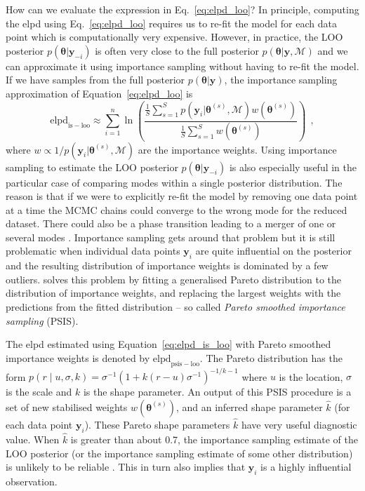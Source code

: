 \documentclass[12pt,dvipsnames]{report}
\renewcommand{\vec}[1]{\boldsymbol{\mathbf{#1}}}
\newcommand{\hquad}{~~}
\begin{document}
How can we evaluate the expression in Eq.~\ref{eq:elpd_loo}?
In principle, computing the elpd using Eq.~\ref{eq:elpd_loo} requires us to 
re-fit the model for each data point which is computationally very expensive. 
However, in practice, the LOO posterior $p(\vec \theta|\vec y_{-i})$
is often very close to the full posterior $p(\vec \theta|\vec y,\mathcal{M})$
and we can approximate it using importance sampling without having to re-fit the model.
If we have samples from the full posterior $p(\vec \theta|\vec y)$, the importance 
sampling approximation of Equation~\ref{eq:elpd_loo} is 
\begin{equation}
\mathrm{elpd}_\mathrm{is-loo}\approx\sum_{i=1}^n\ln\left(\frac{\frac{1}{S} \sum_{s=1}^{S} p\left( \vec y_{i} \lvert\vec \theta^{(s)},\mathcal{M}\right) w\left(\vec\theta^{(s)}\right)}{\frac{1}{S} \sum_{s=1}^{S} w\left(\vec\theta^{(s)}\right)}\right)
\hquad,
\label{eq:elpd_is_loo}
\end{equation}
where $w \propto 1/p\left(\vec y_{i} \lvert\vec\theta^{(s)},\mathcal{M}\right)$ are the 
importance weights. Using importance sampling to estimate the LOO posterior 
$p(\vec \theta|\vec y_{-i})$ is also especially useful in the particular case of 
comparing modes within a single posterior distribution. The reason is that 
if we were to explicitly re-fit the model by removing one data point at a time 
the MCMC chains could converge to the wrong mode for the reduced dataset.
There could also be a phase transition leading to a merger of one or several modes 
\citep{arXiv:2006.12335}. Importance sampling gets around that problem but it is still
 problematic when individual data points $\vec y_i$ are quite influential 
on the posterior and  the resulting distribution of importance weights is dominated 
by a few outliers.  
\citet{2015arXiv150702646V} solves this problem by fitting a generalised
Pareto distribution to the distribution of importance weights, and replacing the largest 
weights with the predictions from the fitted distribution -- so called 
\emph{Pareto smoothed importance sampling} (PSIS). 

The elpd estimated using Equation~\ref{eq:elpd_is_loo} with Pareto smoothed importance weights 
is denoted by $\mathrm{elpd}_\mathrm{psis-loo}$. The Pareto distribution has 
the form $p(r \mid u, \sigma, k)=\sigma^{-1}\left(1+k(r-u) \sigma^{-1}\right)^{-1 / k-1}$
where $u$ is the location, $\sigma$ is the scale and $k$ is the shape parameter.
An output of this PSIS  procedure \citep[described in][]{2015arXiv150702646V,vehtari2017} 
is a set of new stabilised weights $w(\vec\theta^{(s)})$, and an inferred shape parameter $\hat k$ 
(for each data point $\vec y_i$). These Pareto shape parameters $\hat k$ have very useful 
diagnostic value. When $\hat k$ is greater than about 0.7, the importance sampling estimate of 
the LOO posterior (or the importance sampling estimate of some other distribution) is 
unlikely to be reliable \citep{2015arXiv150702646V}. This in turn also implies that 
$\vec y_i$ is a highly influential observation. 
\end{document}
